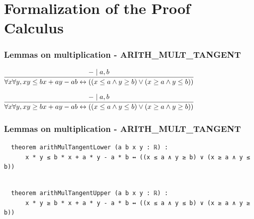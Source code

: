 \documentclass[usepdftitle=false,aspectratio=169,usenames,dvipsnames]{beamer}
\begin{document}
\section{Formalization of the Proof Calculus}


\begin{frame}
  \frametitle{Lemmas on multiplication - ARITH\_MULT\_TANGENT}

\begin{center}
  $\infer[]{\forall x \forall y, xy \le bx + ay - ab \leftrightarrow ((x \le a \land y \ge b) \lor (x \ge a \land y \le b))}{- \mid a, b}$

\end{center}

\vspace{30pt}

\begin{center}

  $\infer[]{\forall x \forall y, xy \ge bx + ay - ab \leftrightarrow ((x \le a \land y \le b) \lor (x \ge a \land y \ge b))}{- \mid a, b}$
\end{center}

\end{frame}

\begin{frame}[fragile]
  \frametitle{Lemmas on multiplication - ARITH\_MULT\_TANGENT}

  \begin{lstlisting}
  theorem arithMulTangentLower (a b x y : ℝ) :
      x * y ≤ b * x + a * y - a * b ↔ ((x ≤ a ∧ y ≥ b) ∨ (x ≥ a ∧ y ≤ b))

  \end{lstlisting}

  \begin{lstlisting}

  theorem arithMulTangentUpper (a b x y : ℝ) :
      x * y ≥ b * x + a * y - a * b ↔ ((x ≤ a ∧ y ≤ b) ∨ (x ≥ a ∧ y ≥ b))
  \end{lstlisting}

\end{frame}



\end{document}
